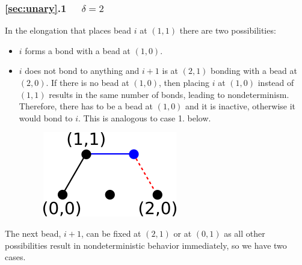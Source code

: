\subsubsection{\ref{sec:unary}.1 \ \ $\delta = 2$\\}

In the elongation that places bead $i$ at $(1,1)$ there are two possibilities:
\begin{itemize}
	\item $i$ forms a bond with a bead at $(1,0)$.
	\item  $i$ does not bond to anything and $i+1$ is at $(2,1)$ bonding with a bead at $(2,0)$. If there is no bead at $(1,0)$, then placing $i$ at $(1,0)$ instead of $(1,1)$ results in the same number of bonds, leading to nondeterminism. Therefore, there has to be a bead at $(1,0)$ and it is inactive, otherwise it would bond to $i$. This is analogous to case 1. below.%
	\begin{figure}
		\centering
		\includegraphics[width=0.2\linewidth]{./Fig/hexagonOut1}
		\label{fig:hexagonOut1}
	\end{figure}
	
\end{itemize}
 

The next bead, $i+1$, can be fixed at $(2,1)$ or at $(0,1)$ as all other possibilities result in nondeterministic behavior immediately, so we have two cases.

